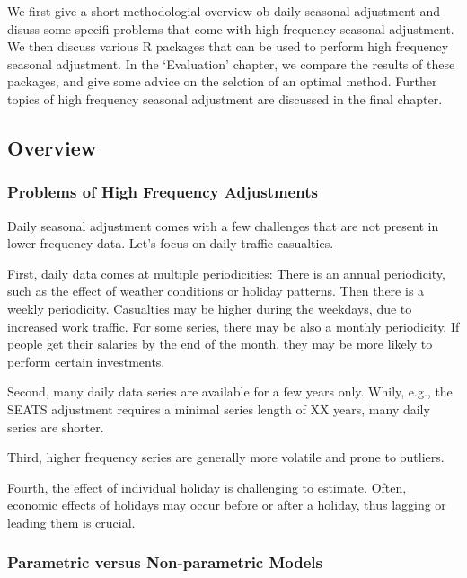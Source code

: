 We first give a short methodologial overview ob daily seasonal
adjustment and disuss some specifi problems that come with high
frequency seasonal adjustment. We then discuss various R packages that
can be used to perform high frequency seasonal adjustment. In the
`Evaluation' chapter, we compare the results of these packages, and give
some advice on the selction of an optimal method. Further topics of high
frequency seasonal adjustment are discussed in the final chapter.

\hypertarget{overview}{%
\subsection{Overview}\label{overview}}

\hypertarget{problems-of-high-frequency-adjustments}{%
\subsubsection{Problems of High Frequency
Adjustments}\label{problems-of-high-frequency-adjustments}}

Daily seasonal adjustment comes with a few challenges that are not
present in lower frequency data. Let's focus on daily traffic
casualties.

First, daily data comes at multiple periodicities: There is an annual
periodicity, such as the effect of weather conditions or holiday
patterns. Then there is a weekly periodicity. Casualties may be higher
during the weekdays, due to increased work traffic. For some series,
there may be also a monthly periodicity. If people get their salaries by
the end of the month, they may be more likely to perform certain
investments.

Second, many daily data series are available for a few years only.
Whily, e.g., the SEATS adjustment requires a minimal series length of XX
years, many daily series are shorter.

Third, higher frequency series are generally more volatile and prone to
outliers.

Fourth, the effect of individual holiday is challenging to estimate.
Often, economic effects of holidays may occur before or after a holiday,
thus lagging or leading them is crucial.

\hypertarget{parametric-versus-non-parametric-models}{%
\subsubsection{Parametric versus Non-parametric
Models}\label{parametric-versus-non-parametric-models}}

